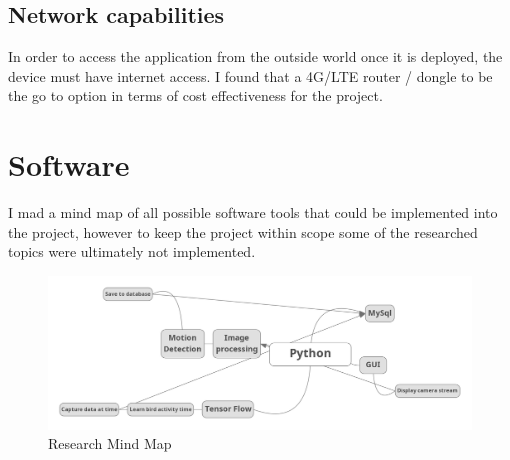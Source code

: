 \subsection{Network capabilities}
In order to access the application from the outside world once it is deployed, the device must have internet access. I found that a 4G/LTE router / dongle to be the go to option in terms of cost effectiveness for the project.

\section{Software}
 I mad a mind map of all possible software tools that could be implemented into the project, however to keep the project within scope some of the researched topics were ultimately not implemented.
   \begin{figure}[!htbp] 
       \centering
        \includegraphics[scale=0.3]{img/mindMap.png}
       \caption{Research Mind Map}
       \label{fig:my_label}
       \end{figure}
